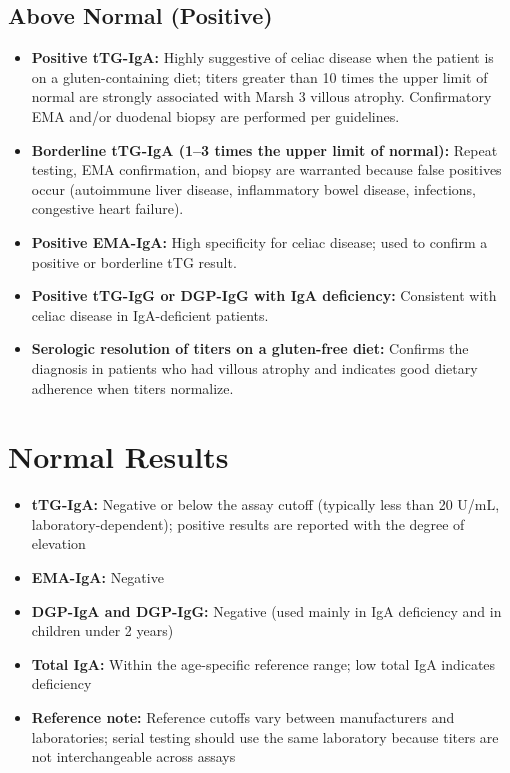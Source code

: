 \subsection*{Above Normal (Positive)}
\begin{itemize}
  \item \textbf{Positive tTG-IgA:} Highly suggestive of celiac disease when the patient is on a gluten-containing diet; titers greater than 10 times the upper limit of normal are strongly associated with Marsh 3 villous atrophy. Confirmatory EMA and/or duodenal biopsy are performed per guidelines.
  \item \textbf{Borderline tTG-IgA (1--3 times the upper limit of normal):} Repeat testing, EMA confirmation, and biopsy are warranted because false positives occur (autoimmune liver disease, inflammatory bowel disease, infections, congestive heart failure).
  \item \textbf{Positive EMA-IgA:} High specificity for celiac disease; used to confirm a positive or borderline tTG result.
  \item \textbf{Positive tTG-IgG or DGP-IgG with IgA deficiency:} Consistent with celiac disease in IgA-deficient patients.
  \item \textbf{Serologic resolution of titers on a gluten-free diet:} Confirms the diagnosis in patients who had villous atrophy and indicates good dietary adherence when titers normalize.
\end{itemize}

\section*{Normal Results}
\begin{itemize}
  \item \textbf{tTG-IgA:} Negative or below the assay cutoff (typically less than 20 U/mL, laboratory-dependent); positive results are reported with the degree of elevation
  \item \textbf{EMA-IgA:} Negative
  \item \textbf{DGP-IgA and DGP-IgG:} Negative (used mainly in IgA deficiency and in children under 2 years)
  \item \textbf{Total IgA:} Within the age-specific reference range; low total IgA indicates deficiency
  \item \textbf{Reference note:} Reference cutoffs vary between manufacturers and laboratories; serial testing should use the same laboratory because titers are not interchangeable across assays
\end{itemize}

